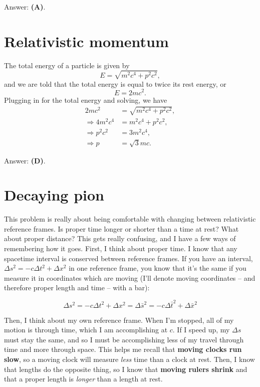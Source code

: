 \documentclass[11pt]{paper}
\newcommand{\answer}[1]{Answer: \textbf{(#1)}.}
\begin{document}
\answer{A}

\section{Relativistic momentum}
The total energy of a particle is given by
\begin{equation}
E = \sqrt{m^2 c^4 + p^2 c^2},
\end{equation}
and we are told that the total energy is equal to twice its rest energy, or
\begin{equation}
E = 2 m c^2.
\end{equation}
Plugging in for the total energy and solving, we have
\begin{align}
2 m c^2 &= \sqrt{m^2 c^4 + p^2 c^2},\\
\Rightarrow 4 m^2 c^4 &= m^2 c^4 + p^2 c^2,\\
\Rightarrow p^2 c^2 &= 3 m^2 c^4,\\
\Rightarrow p &= \sqrt{3} m c.
\end{align}

\answer{D}

\section{Decaying pion}

This problem is really about being comfortable with changing between relativistic reference frames.  Is proper time longer or shorter than a time at rest?  What about proper distance?  This gets really confusing, and I have a few ways of remembering how it goes.  First, I think about proper time.  I know that any spacetime interval is conserved between reference frames.  If you have an interval, $\Delta s^2 = -c\Delta t^2 + \Delta x^2$ in one reference frame, you know that it's the same if you measure it in coordinates which are moving (I'll denote moving coordinates \--- and therefore proper length and time \--- with a bar):

\begin{equation}
\Delta s^2 = -c\Delta t^2 + \Delta x^2 = \Delta \bar{s}^2 = -c\Delta \bar{t}^2 + \Delta \bar{x}^2
\end{equation}

Then, I think about my own reference frame.  When I'm stopped, all of my motion is through time, which I am accomplishing at $c$.  If I speed up, my $\Delta s$ must stay the same, and so I must be accomplishing less of my travel through time and more through space.  This helps me recall that \textbf{moving clocks run slow}, so a moving clock will measure \emph{less} time than a clock at rest.  Then, I know that lengths do the opposite thing, so I know that \textbf{moving rulers shrink} and that a proper length is \emph{longer} than a length at rest.
\end{document}
